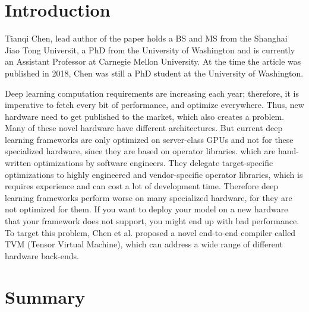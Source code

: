 \section{Introduction}

Tianqi Chen, lead author of the paper holds a BS and MS from the Shanghai Jiao Tong
Universit, a PhD from the University of Washington and is currently an Assistant 
Professor at Carnegie Mellon University. At the time the article was published in 2018, 
Chen was still a PhD student at the University of Washington.

Deep learning computation requirements are increasing each year; therefore, it is imperative
to fetch every bit of performance, and optimize everywhere. Thus, new hardware need to get published to 
the market, which also creates a problem. Many of these novel hardware have different architectures. 
But current deep learning frameworks are only optimized on server-class GPUs and not for these specialized hardware,
since they are based on operator libraries. which are hand-written optimizations by software engineers. 
They delegate target-specific optimizations to highly engineered and vendor-specific operator libraries, which is 
requires experience and can cost a lot of development time. Therefore deep learning frameworks perform worse on 
many specialized hardware, for they are not optimized for them. If you want to deploy your model on a new hardware 
that your framework does not support, you might end up with bad performance.
To target this problem, Chen et al. proposed a novel end-to-end compiler called TVM (Tensor Virtual Machine), which 
can address a wide range of different hardware back-ends.

\section{Summary}

